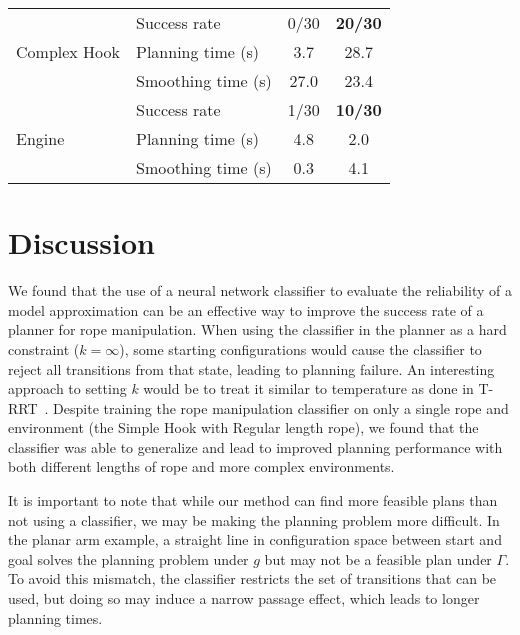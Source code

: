 \begin{table}[h]
\begin{tabular}{|l|l|c|c|}
\hline
\multirow{3}{*}{Complex Hook}               & Success rate          & 0/30  & \textbf{20/30} \\
                                            & Planning time (s)     &  3.7  & 28.7 \\
                                            & Smoothing time (s)    & 27.0  & 23.4 \\
\hline
\multirow{3}{*}{Engine}                     & Success rate          & 1/30  & \textbf{10/30} \\
                                            & Planning time (s)     & 4.8   & 2.0 \\
                                            & Smoothing time (s)    & 0.3   & 4.1 \\
\hline
\end{tabular}
\label{tab:planning_stats}
\end{table}


\section{Discussion}
\label{sec:ral_discussion}

We found that the use of a neural network classifier to evaluate the reliability of a model approximation can be an effective way to improve the success rate of a planner for rope manipulation. When using the classifier in the planner as a hard constraint ($k = \infty$), some starting configurations would cause the classifier to reject all transitions from that state, leading to planning failure. An interesting approach to setting $k$ would be to treat it similar to temperature as done in T-RRT~\cite{Jaillet2008transition}. Despite training the rope manipulation classifier on only a single rope and environment (the Simple Hook with Regular length rope), we found that the classifier was able to generalize and lead to improved planning performance with both different lengths of rope and more complex environments. 

It is important to note that while our method can find more feasible plans than not using a classifier, we may be making the planning problem more difficult. In the planar arm example, a straight line in configuration space between start and goal solves the planning problem under $g$ but may not be a feasible plan under $\Gamma$. To avoid this mismatch, the classifier restricts the set of transitions that can be used, but doing so may induce a narrow passage effect, which leads to longer planning times.

